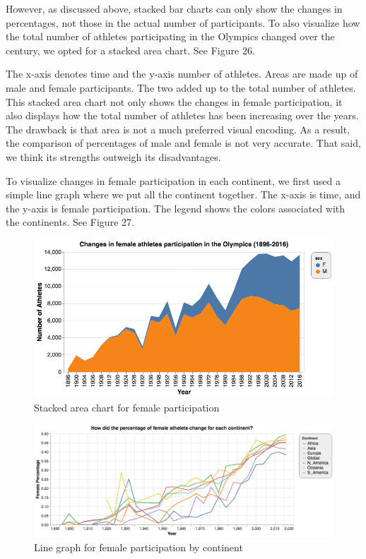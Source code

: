 \documentclass[12pt]{article}
\begin{document}
However, as discussed above, stacked bar charts can only show the changes in percentages, not those in the actual number of participants. To also visualize how the total number of athletes participating in the Olympics changed over the century, we opted for a stacked area chart. See Figure 26.

The x-axis denotes time and the y-axis number of athletes. Areas are made up of male and female participants. The two added up to the total number of athletes. This stacked area chart not only shows the changes in female participation, it also displays how the total number of athletes has been increasing over the years. The drawback is that area is not a much preferred visual encoding. As a result, the comparison of percentages of male and female is not very accurate. That said, we think its strengths outweigh its disadvantages.

To visualize changes in female participation in each continent, we first used a simple line graph where we put all the continent together. The x-axis is time, and the y-axis is female participation. The legend shows the colors associated with the continents. See Figure 27.

\vspace{20pt}
\begin{figure}[!b]
    \centering
    \includegraphics[scale=0.625]{pics/g-1-4_new.png}
    \caption{Stacked area chart for female participation}
    \label{fig:my_label}
\end{figure}

\begin{figure}[!t]
    \centering
    \includegraphics[scale=0.5]{pics/g-2-1_new.png}
    \caption{Line graph for female participation by continent}
    \label{fig:my_label}
\end{figure}
\end{document}
